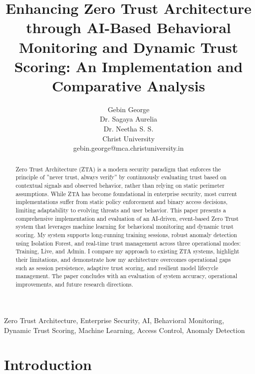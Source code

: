 \documentclass[conference]{IEEEtran}
\begin{document}
\title{Enhancing Zero Trust Architecture through AI-Based Behavioral Monitoring and Dynamic Trust Scoring: An Implementation and Comparative Analysis}

\author{Gebin George\\
Dr. Sagaya Aurelia\\
Dr. Neetha S. S.\\
Christ University\\
gebin.george@mca.christuniversity.in}

\maketitle

\begin{abstract}
Zero Trust Architecture (ZTA) is a modern security
paradigm that enforces the principle of ”never trust, always verify”
by continuously evaluating trust based on contextual signals
and observed behavior, rather than relying on static perimeter
assumptions. While ZTA has become foundational in enterprise
security, most current implementations suffer from static policy
enforcement and binary access decisions, limiting adaptability
to evolving threats and user behavior. This paper presents a
comprehensive implementation and evaluation of an AI-driven,
event-based Zero Trust system that leverages machine learning
for behavioral monitoring and dynamic trust scoring. My system
supports long-running training sessions, robust anomaly detection
using Isolation Forest, and real-time trust management across
three operational modes: Training, Live, and Admin. I compare
my approach to existing ZTA systems, highlight their limitations,
and demonstrate how my architecture overcomes operational
gaps such as session persistence, adaptive trust scoring, and
resilient model lifecycle management. The paper concludes with
an evaluation of system accuracy, operational improvements, and
future research directions.
\end{abstract}

\begin{IEEEkeywords}
Zero Trust Architecture, Enterprise Security, AI, Behavioral Monitoring, Dynamic Trust Scoring, Machine Learning, Access Control, Anomaly Detection
\end{IEEEkeywords}

\section{Introduction}
\end{document}
